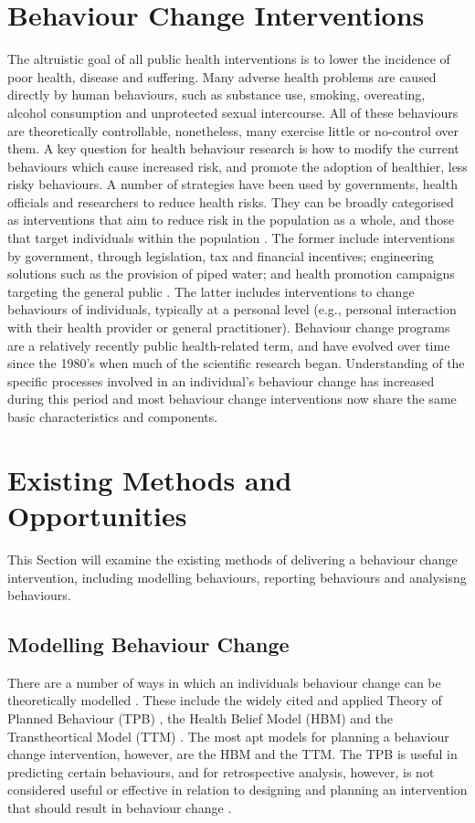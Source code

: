 \section{Behaviour Change Interventions}
The altruistic goal of all public health interventions is to lower the incidence of poor health, disease and suffering. Many adverse health problems are caused directly by human behaviours, such as substance use, smoking, overeating, alcohol consumption and unprotected sexual intercourse. All of these behaviours are theoretically controllable, nonetheless, many exercise little or no-control over them. A key question for health behaviour research is how to modify the current behaviours which cause increased risk, and promote the adoption of healthier, less risky behaviours.
A number of strategies have been used by governments, health officials and researchers to reduce health risks. They can be broadly categorised as interventions that aim to reduce risk in the population as a whole, and those that target individuals within the population \cite{Guilbert2003}. The former include interventions by government, through legislation, tax and financial incentives; engineering solutions such as the provision of piped water; and health promotion campaigns targeting the general public \cite{Guilbert2003}. The latter includes interventions to change behaviours of individuals, typically at a personal level (e.g., personal interaction with their health provider or general practitioner).
Behaviour change programs are a relatively recently public health-related term, and have evolved over time since the 1980's when much of the scientific research began. Understanding of the specific processes involved in an individual's behaviour change has increased during this period and most behaviour change interventions now share the same basic characteristics and components.

\section{Existing Methods and Opportunities}
This Section will examine the existing methods of delivering a behaviour change intervention, including modelling behaviours, reporting behaviours and analysisng behaviours.

\subsection{Modelling Behaviour Change}
There are a number of ways in which an individuals behaviour change can be theoretically modelled \cite{Morris2012a}. These include the widely cited and applied Theory of Planned Behaviour (TPB) \cite{Ajzen1985}, the Health Belief Model (HBM) \cite{Hochbaum1958, Sharma2012} and the Transtheortical Model (TTM) \cite{Prochaska2005, Prochaska2013}. The most apt models for planning a behaviour change intervention, however, are the HBM and the TTM. The TPB is useful in predicting certain behaviours, and for retrospective analysis, however, is not considered useful or effective in relation to designing and planning an intervention that should result in behaviour change \cite{Hardeman2002}.

